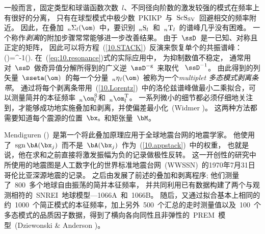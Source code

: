 一般而言，固定类型和球谐函数次数~$l$、不同径向阶数的激发较强的模式在频率上有很好的分离，
只有在球型模式中极少数~PKIKP~与~${\rm ScS}_{\rm SV}$~回避相交的频率附近。
因此，在叠加~${}_n\Sigma_l(\om)$~中，要识别~${}_n{\rm S}_l$~和~${}_n{\rm T}_l$~的谱峰几乎没有困难。
一个称作{\em 剥离\/}的附加步骤常常能够进一步改善结果。
由于~$\ssD$~是一已知、对称且正定的矩阵，
因此可以将方程~(\ref{10.STACK})~反演来恢复单个的共振谱峰：
\eq
\sseta(\om)=\ssD^{-1}\ssSigma(\om).
\label{eq:10.resonance}
\en
在~(\ref{eq:10.resonance})式的实际应用中，
为抑制数值不稳定，
通常用对~$\ssD$~做奇异值分解所得到的广义逆~$\ssD^{-\mbox{\scriptsize g}}$~来取代 ~$\ssD^{-1}$。
%
由此得到的列矢量~$\sseta(\om)$~的每一个分量~${}_n\eta_{\hspace{0.3 mm}l}(\om)$~被称为一个{\em multiplet 多态模式剥离条带\/}。
%
%
通过将每个剥离条带用~(\ref{10.Lorentz})~中的洛伦兹谱峰做最小二乘拟合，可以测量简并的本征频率~${}_n\om_l^{\rm S}$和~${}_n\om_l^{\rm T}$。
一系列微小的细节都必须仔细地关注到，才能够成功地实施叠加和剥离，并使偏差最小化~(Widmer \citeyear{widmer91})。
这两种方法都需要知道每个震源的位置~$\bx_{\rm s}$~和矩张量~$\bM$。

Mendiguren (\citeyear{mendiguren73})~是第一个将此叠加原理应用于全球地震台网的地震学家。
他使用了~${\rm sgn}\,\bA(\bx_j)$~而不是~$\bA(\bx_j)$~作为~(\ref{10.appstack})~中的权重，
也就是说，他在求和之前直接将激发振幅为负的记录做极性反转。
这一开创性的研究中所使用的地震图是人工数字化的世界标准地震台网~(WWSSN)~的1970年7月31日哥伦比亚深源地震的记录。
%
之后由\textcite{gilbert&dziewonski75}发展了前述的叠加和剥离程序;
他们测量了~800~多个地球自由振荡的简并本征频率，
并共同利用已有数据构建了两个与观测相符的~SNREI~地球模型---1066A~和~1066B。
随后，又通过拟合基本上相同的约~1000~个简正模式的本征频率，加上另外~500~个汇总的走时测量值以及~100~个多态模式的品质因子数据，得到了横向各向同性且非弹性的~PREM~模型~(Dziewonski \& Anderson \citeyear{dziewonski&anderson81})。


